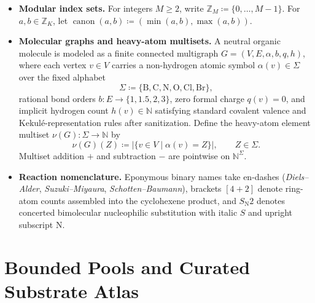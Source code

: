 \documentclass[11pt,a4paper]{article}
\theoremstyle{plain}
\theoremstyle{definition}
\theoremstyle{remark}
\newcommand{\N}{\mathbb{N}}
\newcommand{\Z}{\mathbb{Z}}
\newcommand{\SNtwo}{S_{\mathrm{N}}2}
\begin{document}
\begin{itemize}
  \item \textbf{Modular index sets.} For integers \( M \ge 2 \), write
    \( \Z_M \coloneqq \{0, \dots, M - 1\} \). For \( a, b \in \Z_K \), let
    \( \operatorname{canon}(a, b) \coloneqq (\min(a, b), \max(a, b)) \).
  \item \textbf{Molecular graphs and heavy-atom multisets.} A neutral organic molecule is modeled
    as a finite connected multigraph \( G = (V, E, \alpha, b, q, h) \), where each vertex
    \( v \in V \) carries a non-hydrogen atomic symbol \( \alpha(v) \in \Sigma \) over the fixed
    alphabet
    \[
      \Sigma \coloneqq \{\mathrm{B}, \mathrm{C}, \mathrm{N}, \mathrm{O}, \mathrm{Cl}, \mathrm{Br}\},
    \]
    rational bond orders \( b : E \to \{1, 1.5, 2, 3\} \), zero formal charge \( q(v) = 0 \), and
    implicit hydrogen count \( h(v) \in \N \) satisfying standard covalent valence and
    Kekul\'e-representation rules after
    sanitization. Define the heavy-atom element multiset \( \nu(G) : \Sigma \to \N \) by
    \[
      \nu(G)(Z) \coloneqq \lvert \{ v \in V \mid \alpha(v) = Z \} \rvert, \qquad Z \in \Sigma.
    \]
    Multiset addition \( + \) and subtraction \( - \) are pointwise on \( \N^{\Sigma} \).
  \item \textbf{Reaction nomenclature.} Eponymous binary names take en-dashes
    (\emph{Diels--Alder}, \emph{Suzuki--Miyaura}, \emph{Schotten--Baumann}), brackets
    \([4 + 2]\) denote ring-atom counts assembled into the cyclohexene product, and \( \SNtwo \)
    denotes concerted bimolecular nucleophilic substitution with italic \(S\) and upright subscript
    \(\mathrm{N}\).
\end{itemize}

\section{Bounded Pools and Curated Substrate Atlas}\label{sec:pools}
\end{document}

